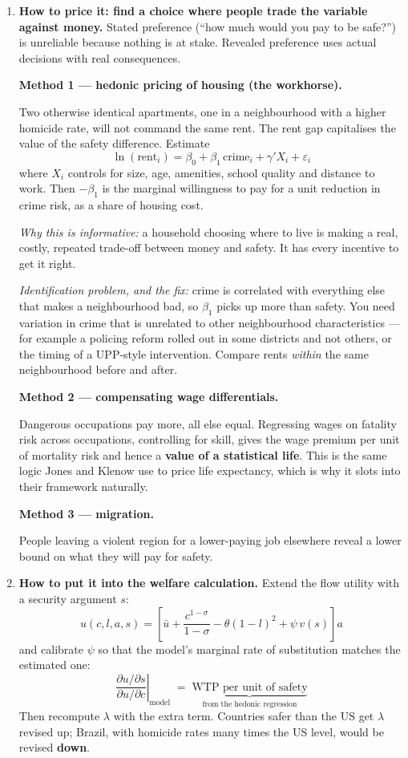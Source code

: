 \documentclass[12pt, letterpaper]{article}
\begin{document}
\begin{tcolorbox}[evenbox,title={Problem 2.2 \quad Other Things that Matter}]
\begin{enumerate}
\item \textbf{How to price it: find a choice where people trade the variable against
money.} Stated preference (``how much would you pay to be safe?'') is unreliable because
nothing is at stake. Revealed preference uses actual decisions with real consequences.

\textbf{Method 1 --- hedonic pricing of housing (the workhorse).}

Two otherwise identical apartments, one in a neighbourhood with a higher homicide rate, will
not command the same rent. The rent gap capitalises the value of the safety difference.
Estimate
$$\ln(\text{rent}_i) = \beta_0 + \beta_1\,\text{crime}_i + \gamma' X_i + \varepsilon_i$$
where $X_i$ controls for size, age, amenities, school quality and distance to work. Then
$-\beta_1$ is the marginal willingness to pay for a unit reduction in crime risk, as a share
of housing cost.

\emph{Why this is informative:} a household choosing where to live is making a real,
costly, repeated trade-off between money and safety. It has every incentive to get it right.

\emph{Identification problem, and the fix:} crime is correlated with everything else that
makes a neighbourhood bad, so $\beta_1$ picks up more than safety. You need variation in
crime that is unrelated to other neighbourhood characteristics --- for example a policing
reform rolled out in some districts and not others, or the timing of a UPP-style
intervention. Compare rents \emph{within} the same neighbourhood before and after.

\textbf{Method 2 --- compensating wage differentials.}

Dangerous occupations pay more, all else equal. Regressing wages on fatality risk across
occupations, controlling for skill, gives the wage premium per unit of mortality risk and
hence a \textbf{value of a statistical life}. This is the same logic Jones and Klenow use to
price life expectancy, which is why it slots into their framework naturally.

\textbf{Method 3 --- migration.}

People leaving a violent region for a lower-paying job elsewhere reveal a lower bound on
what they will pay for safety.

\item \textbf{How to put it into the welfare calculation.} Extend the flow utility with a
security argument $s$:
$$u(c, l, a, s) = \left[\bar u + \frac{c^{1-\sigma}}{1-\sigma} - \theta(1-l)^2
+ \psi\,v(s)\right] a$$
and calibrate $\psi$ so that the model's marginal rate of substitution matches the estimated
one:
$$\left.\frac{\partial u/\partial s}{\partial u/\partial c}\right|_{\text{model}}
\;=\; \underbrace{\text{WTP per unit of safety}}_{\text{from the hedonic regression}}$$
Then recompute $\lambda$ with the extra term. Countries safer than the US get $\lambda$
revised up; Brazil, with homicide rates many times the US level, would be revised
\textbf{down}.


\end{enumerate}
\end{tcolorbox}
\end{document}
